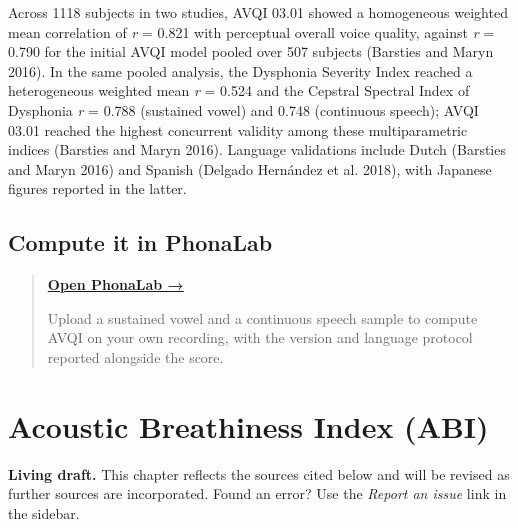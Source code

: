 \documentclass[
  english,
  letterpaper,
]{scrbook}
\begin{document}
Across 1118 subjects in two studies, AVQI 03.01 showed a homogeneous
weighted mean correlation of \emph{r} = 0.821 with perceptual overall
voice quality, against \emph{r} = 0.790 for the initial AVQI model
pooled over 507 subjects (Barsties and Maryn 2016). In the same pooled
analysis, the Dysphonia Severity Index reached a heterogeneous weighted
mean \emph{r} = 0.524 and the Cepstral Spectral Index of Dysphonia
\emph{r} = 0.788 (sustained vowel) and 0.748 (continuous speech); AVQI
03.01 reached the highest concurrent validity among these
multiparametric indices (Barsties and Maryn 2016). Language validations
include Dutch (Barsties and Maryn 2016) and Spanish (Delgado Hernández
et al. 2018), with Japanese figures reported in the latter.

\section{Compute it in PhonaLab}\label{compute-it-in-phonalab-1}

\begin{quote}
\textbf{\href{https://phonalab.com}{Open PhonaLab →}}

Upload a sustained vowel and a continuous speech sample to compute AVQI
on your own recording, with the version and language protocol reported
alongside the score.
\end{quote}

\chapter{Acoustic Breathiness Index
(ABI)}\label{acoustic-breathiness-index-abi}

\begin{tcolorbox}[enhanced jigsaw, arc=.35mm, bottomrule=.15mm, bottomtitle=1mm, breakable, colback=white, colbacktitle=quarto-callout-note-color!10!white, colframe=quarto-callout-note-color-frame, coltitle=black, left=2mm, leftrule=.75mm, opacityback=0, opacitybacktitle=0.6, rightrule=.15mm, title=\textcolor{quarto-callout-note-color}{\faInfo}\hspace{0.5em}{Note}, titlerule=0mm, toprule=.15mm, toptitle=1mm]

\textbf{Living draft.} This chapter reflects the sources cited below and
will be revised as further sources are incorporated. Found an error? Use
the \emph{Report an issue} link in the sidebar.

\end{tcolorbox}
\end{document}
